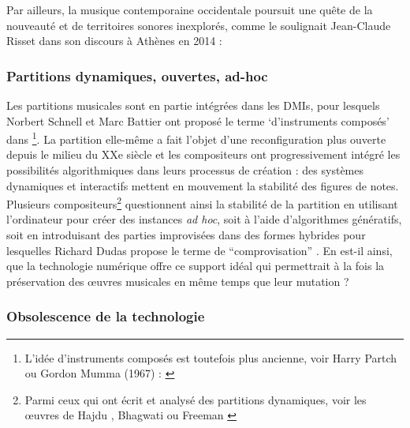 Par ailleurs, la musique contemporaine occidentale poursuit une quête de la nouveauté et de territoires sonores inexplorés, comme le soulignait Jean-Claude Risset dans son discours à Athènes en 2014 \cite{risset_sound_2014}: 

\subsubsection{Partitions dynamiques, ouvertes, ad-hoc}

\noindent Les partitions musicales sont en partie intégrées dans les \glspl{DMI}, pour lesquels Norbert Schnell et Marc Battier ont proposé le terme `d'instruments composés' dans \cite{schnell_introducing_2002}\footnote{L'idée d'instruments composés est toutefois plus ancienne, voir Harry Partch ou Gordon Mumma (1967) : \cite{mumma_creative_1967}}. La partition elle-même a fait l'objet d'une reconfiguration plus ouverte depuis le milieu du XXe siècle et les compositeurs ont progressivement intégré les possibilités algorithmiques dans leurs processus de création : des systèmes dynamiques et interactifs mettent en mouvement la stabilité des figures de notes. Plusieurs compositeurs\footnote{Parmi ceux qui ont écrit et analysé des partitions dynamiques, voir les œuvres de Hajdu \cite{hajdu_disposable_2016}, Bhagwati \cite{bhagwati_vexations_2017} ou Freeman \cite{freeman_extreme_2008}} questionnent ainsi la stabilité de la partition en utilisant l'ordinateur pour créer des instances \textit{ad hoc}, soit à l'aide d'algorithmes génératifs, soit en introduisant des parties improvisées dans des formes hybrides pour lesquelles Richard Dudas propose le terme de ``comprovisation'' \cite{dudas_comprovisation:_2010}. En est-il ainsi, que la technologie numérique offre ce support idéal qui permettrait à la fois la préservation des œuvres musicales en même temps que leur mutation ?

\subsubsection{Obsolescence de la technologie}

